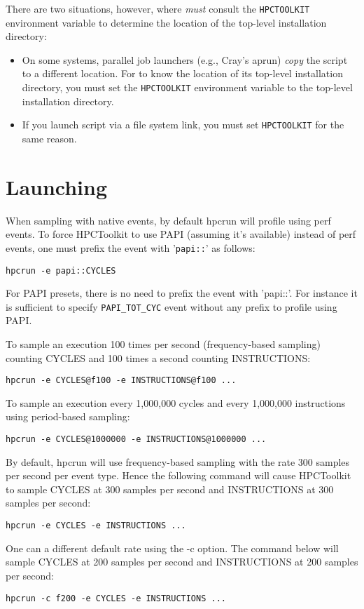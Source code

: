 \documentclass[english]{article}
\begin{document}
There are two situations, however, where 
\emph{must} consult the \verb+HPCTOOLKIT+ environment variable to determine the location
of the top-level installation directory: 

\begin{itemize}
\item On some systems, parallel job launchers (e.g., Cray's aprun) \emph{copy} the
        script to a different location. For  to know
       the location of its top-level installation directory, 
       you must set the \verb+HPCTOOLKIT+ environment variable to the 
       top-level installation directory.
\item 
       If you launch  script via a file system link,
       you must set \verb+HPCTOOLKIT+ for the same reason.
\end{itemize}


\section{Launching}

When sampling with native events, by default hpcrun will profile using perf events.
To force HPCToolkit to use PAPI (assuming it's available) instead of perf events, one
must prefix the event with '\texttt{papi::}' as follows:

\begin{verbatim}
hpcrun -e papi::CYCLES
\end{verbatim}

For PAPI presets, there is no need to prefix the event with 'papi::'. For instance it is
sufficient to specify \texttt{PAPI\_TOT\_CYC} event without any prefix to profile using PAPI.

To sample an execution 100 times per second (frequency-based sampling) counting
CYCLES and 100 times a second counting INSTRUCTIONS:
\begin{verbatim}
hpcrun -e CYCLES@f100 -e INSTRUCTIONS@f100 ...
\end{verbatim}

To sample an execution every 1,000,000 cycles and every 1,000,000 instructions using
period-based sampling:
\begin{verbatim}
hpcrun -e CYCLES@1000000 -e INSTRUCTIONS@1000000 ...
\end{verbatim}
By default, hpcrun will use frequency-based sampling with the rate 300 samples per
second per event type. Hence the following command will cause HPCToolkit to sample
CYCLES at 300 samples per second and INSTRUCTIONS at 300 samples per second:
\begin{verbatim}
hpcrun -e CYCLES -e INSTRUCTIONS ...
\end{verbatim}
One can a different default rate using the -c option. The command below will sample
CYCLES at 200 samples per second and INSTRUCTIONS at 200 samples per second:
\begin{verbatim}
hpcrun -c f200 -e CYCLES -e INSTRUCTIONS ...
\end{verbatim}
\end{document}

